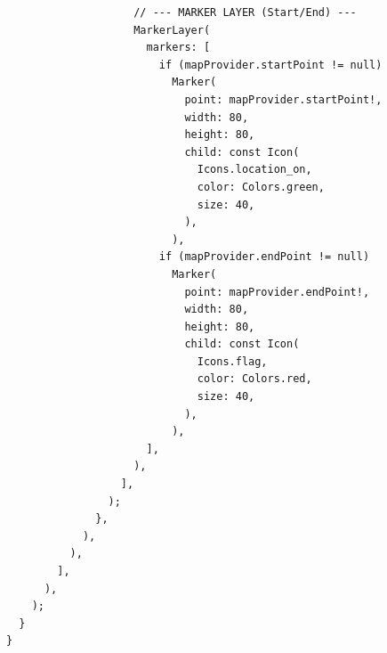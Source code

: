 \begin{lstlisting}
                    // --- MARKER LAYER (Start/End) ---
                    MarkerLayer(
                      markers: [
                        if (mapProvider.startPoint != null)
                          Marker(
                            point: mapProvider.startPoint!,
                            width: 80,
                            height: 80,
                            child: const Icon(
                              Icons.location_on,
                              color: Colors.green,
                              size: 40,
                            ),
                          ),
                        if (mapProvider.endPoint != null)
                          Marker(
                            point: mapProvider.endPoint!,
                            width: 80,
                            height: 80,
                            child: const Icon(
                              Icons.flag,
                              color: Colors.red,
                              size: 40,
                            ),
                          ),
                      ],
                    ),
                  ],
                );
              },
            ),
          ),
        ],
      ),
    );
  }
}
\end{lstlisting}
